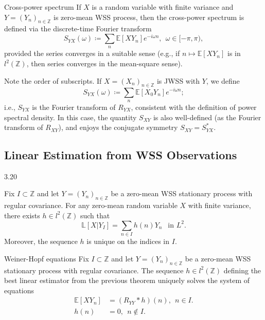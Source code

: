 \documentclass{article}
\begin{document}
\begin{defn}{Cross-power spectrum}{}
If \( X \) is a random variable with finite variance and \( Y = (Y_{n} )_{n \in \mathbb{Z} } \) is zero-mean WSS process, then the cross-power spectrum is defined via the discrete-time Fourier transform
\[
    S_{YX}(\omega ) \coloneqq \sum_{n} \mathbb{E} [XY_{n} ]e^{-i \omega n} , \ \ \omega \in [- \pi ,\pi ),
\] 
provided the series converges in a suitable sense (e.g., if \( n \mapsto \mathbb{E} [XY_{n} ] \) is in \( l^2(\mathbb{Z})  \), then series converges in the mean-square sense).

Note the order of subscripts. If \( X = (X_{n} )_{n \in\mathbb{Z} } \) is JWSS with \( Y \), we define 
\[
    S_{YX}(\omega ) \coloneqq \sum_{n} \mathbb{E} [X_0 Y_{n} ]e^{-i \omega n};
\]
i.e., \( S_{YX}  \) is the Fourier transform of \( R_{YX}  \), consistent with the definition of power spectral density. In this case, the quantity \( S_{XY}  \) is also well-defined (as the Fourier transform of \( R_{XY}  \)), and enjoys the conjugate symmetry \( S_{XY }= S^{\ast} _{YX}  \). 
\end{defn}

\subsection{Linear Estimation from WSS Observations}

\begin{thrm}{}{3.20}

    Fix \( I \subset \mathbb{Z}  \) and let \( Y = (Y_{n} )_{n\in \mathbb{Z} }  \) be a zero-mean WSS stationary process with regular covariance. For any zero-mean random variable \( X \) with finite variance, there exists \( h \in l^2(\mathbb{Z} ) \) such that 
    \[
        \mathbb{L} [X |Y_{I} ] = \sum_{n\in I } h(n)Y_{n}   \ \ \text{ in } L^2. 
    \]
    Moreover, the sequence \( h \) is unique on the indices in \( I \). 
\end{thrm}

\begin{thrm}{Weiner-Hopf equations}{}
Fix \( I \subset \mathbb{Z}  \) and let \( Y = (Y_{n} )_{n \in \mathbb{Z} } \) be a zero-mean WSS stationary process with regular covariance. The sequence \( h \in l^2(\mathbb{Z} ) \) defining the best linear estimator from the previous theorem uniquely solves the system of equations
\begin{align*}
    \mathbb{E} [XY_{n} ]  &=  (R_{Y Y} \ast h)(n),  \ \ n \in I.\\
    h(n)&= 0, \ \ n \notin I. 
\end{align*}

\end{thrm}
\end{document}
